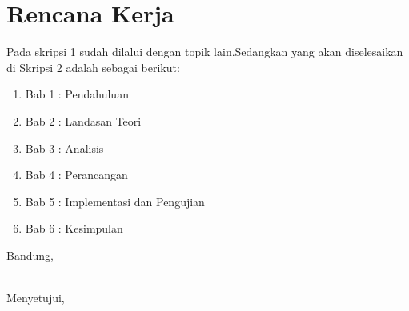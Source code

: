 \documentclass[a4paper,twoside]{article}
\begin{document}
	\section{Rencana Kerja}
	Pada skripsi 1 sudah dilalui dengan topik lain.Sedangkan yang akan diselesaikan di Skripsi 2 adalah sebagai berikut:
	\begin{enumerate}
		\item Bab 1 : Pendahuluan
		\item Bab 2 : Landasan Teori
		\item Bab 3 : Analisis
		\item Bab 4 : Perancangan
		\item Bab 5 : Implementasi dan Pengujian
		\item Bab 6 : Kesimpulan
	\end{enumerate}
	
	\vspace{1cm}
	\centering Bandung, \tanggal\\
	\vspace{2cm} \nama \\ 
	\vspace{1cm}
	
	Menyetujui, \\
\end{document}
